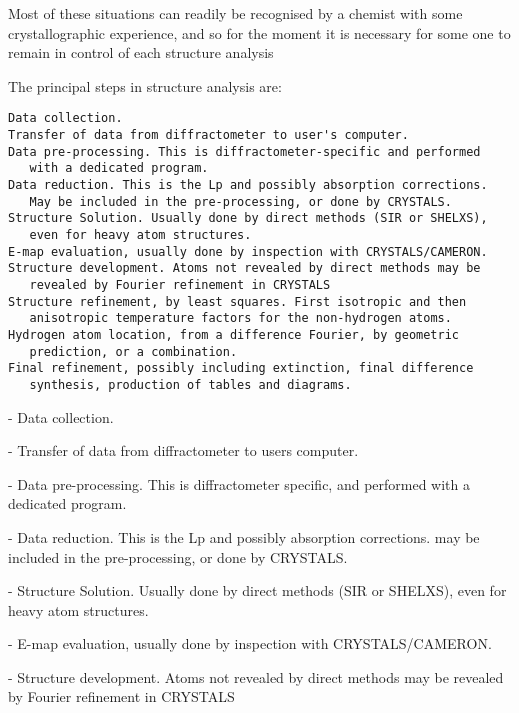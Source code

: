 \documentclass[10pt,a4paper]{report}
\begin{document}
Most of these situations can readily be recognised by a chemist with
some crystallographic experience, and so for the moment it is necessary
for some one to remain in control of each structure analysis





\bigskip{}





The principal steps in structure analysis are:


\small\begin{verbatim}
Data collection.
Transfer of data from diffractometer to user's computer.
Data pre-processing. This is diffractometer-specific and performed
   with a dedicated program.
Data reduction. This is the Lp and possibly absorption corrections.
   May be included in the pre-processing, or done by CRYSTALS.
Structure Solution. Usually done by direct methods (SIR or SHELXS),
   even for heavy atom structures.
E-map evaluation, usually done by inspection with CRYSTALS/CAMERON.
Structure development. Atoms not revealed by direct methods may be
   revealed by Fourier refinement in CRYSTALS
Structure refinement, by least squares. First isotropic and then
   anisotropic temperature factors for the non-hydrogen atoms.
Hydrogen atom location, from a difference Fourier, by geometric
   prediction, or a combination.
Final refinement, possibly including extinction, final difference
   synthesis, production of tables and diagrams.
\end{verbatim}\normalsize





- Data collection.


- Transfer of data from diffractometer to users computer.


- Data pre-processing. This is diffractometer specific, and performed
   with a dedicated program.


- Data reduction. This is the Lp and possibly absorption corrections.
may be included in the pre-processing, or done by CRYSTALS.


- Structure Solution. Usually done by direct methods (SIR or SHELXS),
   even for heavy atom structures.


- E-map evaluation, usually done by inspection with CRYSTALS/CAMERON.


- Structure development. Atoms not revealed by direct methods may be
   revealed by Fourier refinement in CRYSTALS
\end{document}
